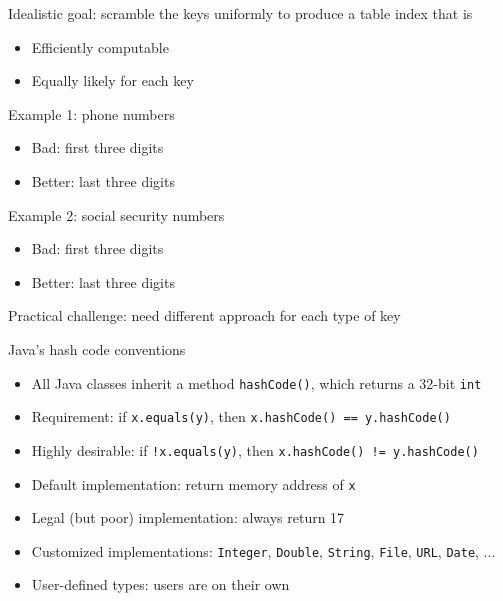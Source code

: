 \documentclass[8pt,a4paper,compress]{beamer}
\begin{document}
\begin{frame}[fragile]
Idealistic goal: scramble the keys uniformly to produce a table index that is
\begin{itemize}
\item Efficiently computable

\item Equally likely for each key
\end{itemize}

\bigskip

Example 1: phone numbers
\begin{itemize}
\item Bad: first three digits

\item Better: last three digits
\end{itemize}

\bigskip

Example 2: social security numbers
\begin{itemize}
\item Bad: first three digits

\item Better: last three digits
\end{itemize}

\bigskip

Practical challenge: need different approach for each type of key
\end{frame}

\begin{frame}[fragile]
Java's hash code conventions
\begin{itemize}
\item All Java classes inherit a method \lstinline{hashCode()}, which returns a 32-bit \lstinline{int}

\item Requirement: if \lstinline{x.equals(y)}, then \lstinline{x.hashCode() == y.hashCode()}

\item Highly desirable: if \lstinline{!x.equals(y)}, then \lstinline{x.hashCode() != y.hashCode()}

\item Default implementation: return memory address of \lstinline{x}

\item Legal (but poor) implementation: always return 17

\item Customized implementations: \lstinline{Integer}, \lstinline{Double}, \lstinline{String}, \lstinline{File}, \lstinline{URL}, \lstinline{Date}, ...

\item User-defined types: users are on their own
\end{itemize}
\end{frame}
\end{document}

